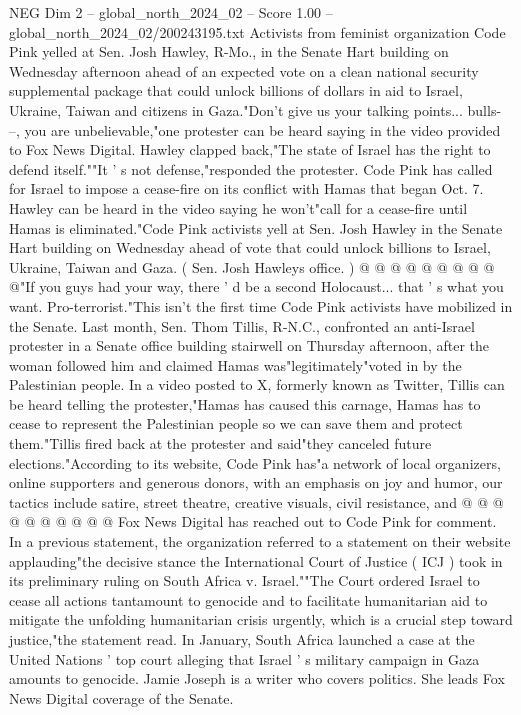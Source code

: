 \begin{textsample}{NEG Dim 2 – global\_north\_2024\_02 – Score 1.00 – global\_north\_2024\_02/200243195.txt}  \label{ex:f2_neg_306}
Activists from feminist organization Code Pink yelled at Sen.
Josh Hawley, R-Mo., in the Senate Hart building on Wednesday afternoon ahead of an expected vote on a clean national security supplemental package that could unlock billions of dollars in aid to Israel, Ukraine, Taiwan and citizens in Gaza."Don't give us your talking points... bulls- --, you are unbelievable,"one protester can be heard saying in the video provided to Fox News Digital.
Hawley clapped back,"The state of Israel has the right to defend itself.""It ' s not defense,"responded the protester.
Code Pink has called for Israel to impose a cease-fire on its conflict with Hamas that began Oct. 7.
Hawley can be heard in the video saying he won't"call for a cease-fire until Hamas is eliminated."Code Pink activists yell at Sen.
Josh Hawley in the Senate Hart building on Wednesday ahead of vote that could unlock billions to Israel, Ukraine, Taiwan and Gaza. ( Sen.
Josh Hawleys office. ) @ @ @ @ @ @ @ @ @ @"If you guys had your way, there ' d be a second Holocaust... that ' s what you want.
Pro-terrorist."This isn't the first time Code Pink activists have mobilized in the Senate.
Last month, Sen.
Thom Tillis, R-N.C., confronted an anti-Israel protester in a Senate office building stairwell on Thursday afternoon, after the woman followed him and claimed Hamas was"legitimately"voted in by the Palestinian people.
In a video posted to X, formerly known as Twitter, Tillis can be heard telling the protester,"Hamas has caused this carnage, Hamas has to cease to represent the Palestinian people so we can save them and protect them."Tillis fired back at the protester and said"they canceled future elections."According to its website, Code Pink has"a network of local organizers, online supporters and generous donors, with an emphasis on joy and humor, our tactics include satire, street theatre, creative visuals, civil resistance, and @ @ @ @ @ @ @ @ @ @ Fox News Digital has reached out to Code Pink for comment.
In a previous statement, the organization referred to a statement on their website applauding"the decisive stance the International Court of Justice ( ICJ ) took in its preliminary ruling on South Africa v.
Israel.""The Court ordered Israel to cease all actions tantamount to genocide and to facilitate humanitarian aid to mitigate the unfolding humanitarian crisis urgently, which is a crucial step toward justice,"the statement read.
In January, South Africa launched a case at the United Nations ' top court alleging that Israel ' s military campaign in Gaza amounts to genocide.
Jamie Joseph is a writer who covers politics.
She leads Fox News Digital coverage of the Senate.

\end{textsample}
